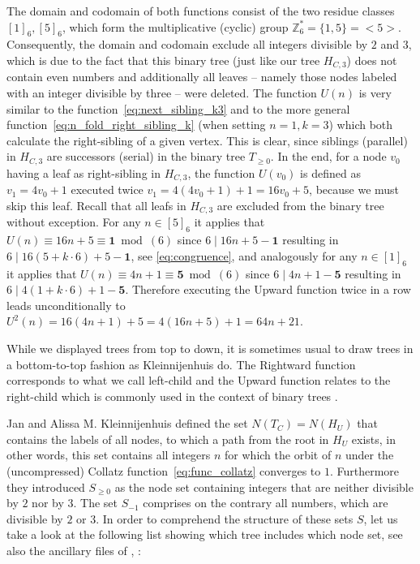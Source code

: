 The domain and codomain of both functions consist of the two residue classes $[1]_6,[5]_6$, which form the multiplicative (cyclic) group $\mathbb{Z}^\ast_6=\{1,5\}=<5>$. Consequently, the domain and codomain exclude all integers divisible by $2$ and $3$, which is due to the fact that this binary tree (just like our tree $H_{C,3}$) does not contain even numbers and additionally all leaves -- namely those nodes labeled with an integer divisible by three -- were deleted. The function $U(n)$ is very similar to the function~\ref{eq:next_sibling_k3} and to the more general function~\ref{eq:n_fold_right_sibling_k} (when setting $n=1,k=3$) which both calculate the right-sibling of a given vertex. This is clear, since siblings (parallel) in $H_{C,3}$ are successors (serial) in the binary tree $T_{\ge0}$. In the end, for a node $v_0$ having a leaf as right-sibling in $H_{C,3}$, the function $U(v_0)$ is defined as $v_1=4v_0+1$ executed twice $v_1=4(4v_0+1)+1=16v_0+5$, because we must skip this leaf. Recall that all leafs in $H_{C,3}$ are excluded from the binary tree without exception. For any $n\in[5]_6$ it applies that $U(n)\equiv16n+5\equiv\boldsymbol{1}\bmod(6)$ since $6\mid16n+5-\boldsymbol{1}$ resulting in $6\mid16(5+k\cdot6)+5-\boldsymbol{1}$, see \ref{eq:congruence}, and analogously for any $n\in[1]_6$ it applies that $U(n)\equiv4n+1\equiv\boldsymbol{5}\bmod(6)$ since $6\mid4n+1-\boldsymbol{5}$ resulting in $6\mid4(1+k\cdot6)+1-\boldsymbol{5}$. Therefore executing the Upward function twice in a row leads unconditionally to $U^2(n)=16(4n+1)+5=4(16n+5)+1=64n+21$.

\begin{remark}
	While we displayed trees from top to down, it is sometimes usual to draw trees in a bottom-to-top fashion as Kleinnijenhuis \cite{Ref_Kleinnijenhuis_2020b} do. The Rightward function corresponds to what we call left-child and the Upward function relates to the right-child which is commonly used in the context of binary trees \cite[p. 246]{Ref_Mazur_2010}.
\end{remark}

Jan and Alissa M. Kleinnijenhuis \cite{Ref_Kleinnijenhuis_2020a} defined the set $N(T_C)=N(H_U)$ that contains the labels of all nodes, to which a path from the root in $H_U$ exists, in other words, this set contains all integers $n$ for which the orbit of $n$ under the (uncompressed) Collatz function~\ref{eq:func_collatz} converges to $1$. Furthermore they introduced $S_{\ge0}$ as the node set containing integers that are neither divisible by $2$ nor by $3$. The set $S_{-1}$ comprises on the contrary all numbers, which are divisible by $2$ or $3$. In order to comprehend the structure of these sets $S$, let us take a look at the following list showing which tree includes which node set, see also the ancillary files of \cite{Ref_Kleinnijenhuis_2020a}, \cite{Ref_Kleinnijenhuis_2020b}:

